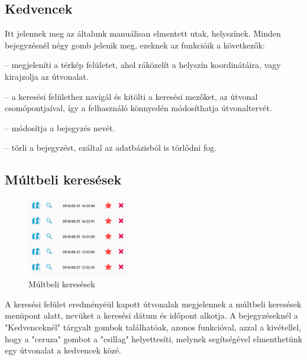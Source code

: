\subsection{Kedvencek}
 
 Itt jelennek meg az általunk manuálisan elmentett utak, helyszínek. Minden bejegyzésnél négy gomb jelenik meg, ezeknek az funkcióik a következők:
 
 \begin{description}
 	\setlength{\itemsep}{0.04mm}
 	\item[térkép] -- megjeleníti a térkép felületet, ahol ráközelít a helyszín koordinátáira, vagy kirajzolja az útvonalat.
 	\item[nagyító] -- a keresési felülethez navigál és kitölti a keresési mezőket, az útvonal csomópontjaíval, így a felhasználó könnyedén módosíthatja útvonaltervét.
 	\item[ceruza] -- módosítja a bejegyzés nevét.
 	\item[szemetes veder] -- törli a bejegyzést, ezáltal az adatbázisból is törlődni fog.
 \end{description}

\subsection{Múltbeli keresések}

\begin{figure}
	\centering
	\setlength{\abovecaptionskip}{0pt}
	\setlength{\belowcaptionskip}{-30pt}
	\includegraphics[width=0.4\textwidth]{images/history}
	\caption{Múltbeli keresések\label{fig:history}}
\end{figure}

A keresési felület eredményéül kapott útvonalak megjelennek a múltbeli keresések menüpont alatt, nevüket a keresési dátum és időpont alkotja. A bejegyzéseknél a "Kedvenceknél" tárgyalt gombok találhatóak, azonos funkcióval, azzal a kivétellel, hogy a "ceruza" gombot a "csillag" helyettesíti, melynek segítségével elmenthetünk egy útvonalat a kedvencek közé.


